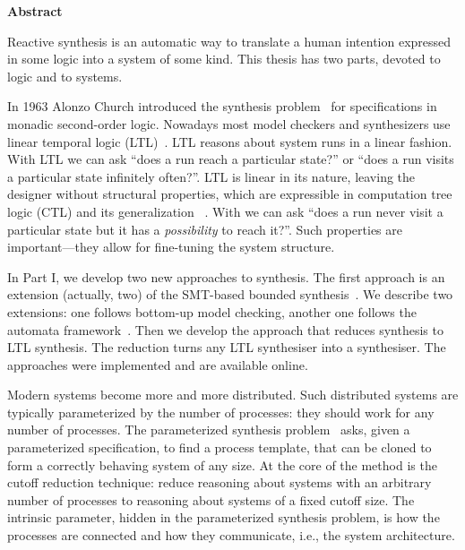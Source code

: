 

\cleardoublepage



\begin{center}
{\Large\bfseries Abstract}
\end{center}
Reactive synthesis is an automatic way
to translate a human intention expressed in some logic
into a system of some kind.
This thesis has two parts, devoted to logic and to systems.

In 1963 Alonzo Church introduced the synthesis problem~\cite{Church63}
for specifications in monadic second-order logic.
Nowadays most model checkers and synthesizers use linear temporal logic (LTL)~\cite{pnueli1977temporal}.
LTL reasons about system runs in a linear fashion.
With LTL we can ask ``does a run reach a particular state?'' or
``does a run visits a particular state infinitely often?''.
LTL is linear in its nature, leaving the designer without structural properties,
which are expressible in computation tree logic (CTL) and its generalization \CTLstar~\cite{ctl-origin,ctlstar-origin}.
With \CTLstar we can ask
``does a run never visit a particular state but it has a \emph{possibility}
  to reach it?''.
Such properties are important---they allow for fine-tuning the system structure.

In Part I, we develop two new approaches to \CTLstar synthesis.
The first approach is an extension (actually, two) of
the SMT-based bounded synthesis~\cite{BS}.
We describe two extensions:
one follows bottom-up \CTLstar model checking,
another one follows the automata framework~\cite{ATA}.
Then we develop the approach that reduces \CTLstar synthesis to LTL synthesis.
The reduction turns any LTL synthesiser into a \CTLstar synthesiser.
The approaches were implemented and are available online.

Modern systems become more and more distributed.
Such distributed systems are typically parameterized by the number of processes:
they should work for any number of processes.
The parameterized synthesis problem~\cite{JB14} asks,
given a parameterized specification, to find a process template,
that can be cloned to form a correctly behaving system of any size.
At the core of the method is the cutoff reduction technique:
reduce reasoning about systems with an arbitrary number of processes
to reasoning about systems of a fixed cutoff size.
The intrinsic parameter, hidden in the parameterized synthesis problem,
is how the processes are connected and how they communicate,
i.e., the system architecture.

